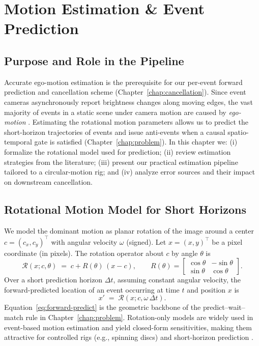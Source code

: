 \chapter{Motion Estimation \& Event Prediction}
\label{chap:motion}

\section{Purpose and Role in the Pipeline}
Accurate ego-motion estimation is the prerequisite for our per-event forward prediction and cancellation scheme (Chapter~\ref{chap:cancellation}). Since event cameras asynchronously report brightness changes along moving edges, the vast majority of events in a static scene under camera motion are caused by \emph{ego-motion} \cite{Gallego2020Survey}. Estimating the rotational motion parameters allows us to predict the short-horizon trajectories of events and issue anti-events when a causal spatio-temporal gate is satisfied (Chapter~\ref{chap:problem}). In this chapter we: (i) formalize the rotational model used for prediction; (ii) review estimation strategies from the literature; (iii) present our practical estimation pipeline tailored to a circular-motion rig; and (iv) analyze error sources and their impact on downstream cancellation.


\section{Rotational Motion Model for Short Horizons}
We model the dominant motion as planar rotation of the image around a center $c=(c_x,c_y)^\top$ with angular velocity $\omega$ (signed). Let $x=(x,y)^\top$ be a pixel coordinate (in pixels). The rotation operator about $c$ by angle $\theta$ is
\begin{equation}
\mathcal{R}(x; c, \theta) \;=\; c + R(\theta)\,(x-c), 
\qquad
R(\theta) = 
\begin{bmatrix}
\cos\theta & -\sin\theta\\
\sin\theta & \cos\theta
\end{bmatrix}.
\label{eq:rot-op}
\end{equation}
Over a short prediction horizon $\Delta t$, assuming constant angular velocity, the forward-predicted location of an event occurring at time $t$ and position $x$ is
\begin{equation}
x' \;=\; \mathcal{R}\!\left(x; c, \omega\,\Delta t\right).
\label{eq:forward-predict}
\end{equation}
Equation~\eqref{eq:forward-predict} is the geometric backbone of the predict–wait–match rule in Chapter~\ref{chap:problem}. Rotation-only models are widely used in event-based motion estimation and yield closed-form sensitivities, making them attractive for controlled rigs (e.g., spinning discs) and short-horizon prediction \cite{Gallego2017Angular,Gallego2018CMax,Stoffregen2019Segmentation}.

